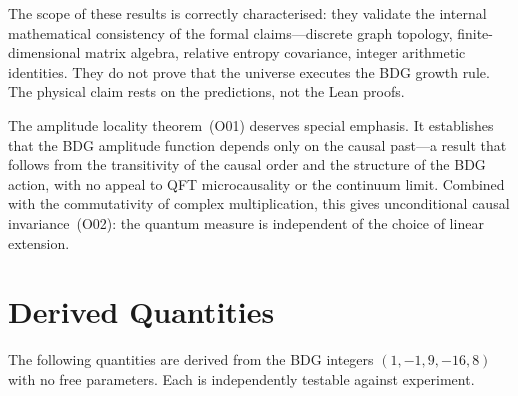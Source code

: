 \documentclass[11pt,a4paper]{article}
\theoremstyle{plain}
\theoremstyle{definition}
\theoremstyle{remark}
\begin{document}
The scope of these results is correctly characterised: they validate the
internal mathematical consistency of the formal claims---discrete graph
topology, finite-dimensional matrix algebra, relative entropy covariance,
integer arithmetic identities.  They do not prove that the universe executes the
BDG growth rule.  The physical claim rests on the predictions, not the Lean
proofs.

The amplitude locality theorem~(O01) deserves special emphasis.  It establishes
that the BDG amplitude function depends only on the causal past---a result that
follows from the transitivity of the causal order and the structure of the BDG
action, with no appeal to QFT microcausality or the continuum limit.  Combined
with the commutativity of complex multiplication, this gives unconditional
causal invariance~(O02): the quantum measure is independent of the choice of
linear extension.

\section{Derived Quantities}\label{sec:quantities}

The following quantities are derived from the BDG integers $(1,-1,9,-16,8)$ with
no free parameters.  Each is independently testable against experiment.
\end{document}
